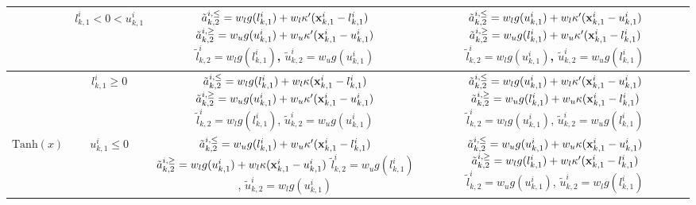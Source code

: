 \begin{table}[t]
{\begin{tabular}{c|c|c|c}
        & $l^i_{k,1} < 0 < u^i_{k,1}$ &  \tabincell{l}{$\tilde{a}^{i,\le}_{k,2}= w_l g(l^i_{k,1})+w_l\kappa^\prime ({\mathbf{x}}^i_{k,1}-l^i_{k,1})$ \\ $\tilde{a}^{i,\ge}_{k,2}=w_u g(u^i_{k,1})+w_u\kappa^\prime ({\mathbf{x}}^i_{k,1}-u^i_{k,1})$\\ $\tilde{l}^{i}_{k,2}= w_l g(l^i_{k,1})$, $\tilde{u}^i_{k,2}= w_u g(u^i_{k,1})$} & 
         \tabincell{l}{$\tilde{a}^{i,\le}_{k,2}= w_l g(u^i_{k,1})+w_l\kappa^\prime ({\mathbf{x}}^i_{k,1}-u^i_{k,1})$ \\ $\tilde{a}^{i,\ge}_{k,2}=w_u g(l^i_{k,1})+w_u\kappa^\prime ({\mathbf{x}}^i_{k,1}-l^i_{k,1})$\\ $\tilde{l}^{i}_{k,2}= w_l g(u^i_{k,1})$, $\tilde{u}^i_{k,2}= w_u g(l^i_{k,1})$} \\  \midrule


         & $l^i_{k,1} \ge 0$ &  \tabincell{l}{$\tilde{a}^{i,\le}_{k,2}= w_l g(l^i_{k,1})+w_l\kappa ({\mathbf{x}}^i_{k,1}-l^i_{k,1})$ \\ $\tilde{a}^{i,\ge}_{k,2}=w_u g(u^i_{k,1})+w_u\kappa^\prime ({\mathbf{x}}^i_{k,1}-u^i_{k,1})$ \\ $\tilde{l}^{i}_{k,2}= w_l g(l^i_{k,1})$, $\tilde{u}^i_{k,2}= w_u g(u^i_{k,1})$} & 
        \tabincell{l}{$\tilde{a}^{i,\le}_{k,2}= w_l g(u^i_{k,1})+w_l\kappa^\prime ({\mathbf{x}}^i_{k,1}-u^i_{k,1})$ \\ $\tilde{a}^{i,\ge}_{k,2}=w_u g(l^i_{k,1})+w_u\kappa ({\mathbf{x}}^i_{k,1}-l^i_{k,1})$ \\ $\tilde{l}^{i}_{k,2}= w_l g(u^i_{k,1})$, $\tilde{u}^i_{k,2}= w_u g(l^i_{k,1})$} \\  \cline{2-4}

        $\text{Tanh}(x)$ & $u^i_{k,1} \le 0$ & \tabincell{l}{$\tilde{a}^{i,\le}_{k,2}= w_u g(l^i_{k,1})+w_u\kappa^\prime ({\mathbf{x}}^i_{k,1}-l^i_{k,1})$ \\ $\tilde{a}^{i,\ge}_{k,2}=w_l g(u^i_{k,1})+w_l\kappa ({\mathbf{x}}^i_{k,1}-u^i_{k,1})$ \\ $\tilde{l}^{i}_{k,2}= w_u g(l^i_{k,1})$, $\tilde{u}^i_{k,2}= w_l g(u^i_{k,1})$} & \tabincell{l}{$\tilde{a}^{i,\le}_{k,2}= w_u g(u^i_{k,1})+w_u\kappa ({\mathbf{x}}^i_{k,1}-u^i_{k,1})$ \\ $\tilde{a}^{i,\ge}_{k,2}=w_l g(l^i_{k,1})+w_l\kappa^\prime ({\mathbf{x}}^i_{k,1}-l^i_{k,1})$ \\ $\tilde{l}^{i}_{k,2}= w_u g(u^i_{k,1})$, $\tilde{u}^i_{k,2}= w_l g(l^i_{k,1})$} \\ \cline{2-4}


\end{tabular}}
\end{table}
